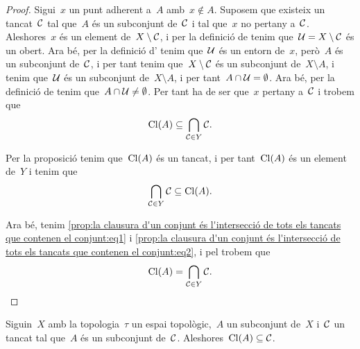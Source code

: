 \documentclass[../../main.tex]{subfiles}
\begin{document}
    \begin{proof}
        Sigui~\(x\) un punt adherent a~\(A\) amb~\(x\notin A\).
        Suposem que existeix un tancat~\(\mathcal{C}\) tal que~\(A\) és un subconjunt de~\(\mathcal{C}\) i tal que~\(x\) no pertany a~\(\mathcal{C}\).
        Aleshores~\(x\) és un element de~\(X\setminus\mathcal{C}\), i per la definició de  tenim que~\(\mathcal{U}=X\setminus\mathcal{C}\) és un obert.
        Ara bé, per la definició d' tenim que~\(\mathcal{U}\) és un entorn de~\(x\), però~\(A\) és un subconjunt de~\(\mathcal{C}\), i per tant tenim que~\(X\setminus\mathcal{C}\) és un subconjunt de~\(X\setminus A\), i tenim que~\(\mathcal{U}\) és un subconjunt de~\(X\setminus A\), i per tant~\(A\cap\mathcal{U}=\emptyset\).
        Ara bé, per la definició de  tenim que~\(A\cap\mathcal{U}\neq\emptyset\).
        Per tant ha de ser que~\(x\) pertany a~\(\mathcal{C}\) i trobem que
        \begin{equation}
            \label{prop:la clausura d'un conjunt és l'intersecció de tots els tancats que contenen el conjunt:eq1}
            \operatorname{Cl}(A)\subseteq\bigcap_{\mathcal{C}\in Y}\mathcal{C}.
        \end{equation}

        Per la proposició  tenim que~\(\operatorname{Cl}(A)\) és un tancat, i per tant~\(\operatorname{Cl}(A)\) és un element de~\(Y\) i tenim que
        \begin{equation}
            \label{prop:la clausura d'un conjunt és l'intersecció de tots els tancats que contenen el conjunt:eq2}
            \bigcap_{\mathcal{C}\in Y}\mathcal{C}\subseteq\operatorname{Cl}(A).
        \end{equation}

        Ara bé, tenim \eqref{prop:la clausura d'un conjunt és l'intersecció de tots els tancats que contenen el conjunt:eq1} i \eqref{prop:la clausura d'un conjunt és l'intersecció de tots els tancats que contenen el conjunt:eq2}, i pel  trobem que
        \[
            \operatorname{Cl}(A)=\bigcap_{\mathcal{C}\in Y}\mathcal{C}.\qedhere
        \]
    \end{proof}
    \begin{corollary}
        \label{cor:la clausura d'un conjunt és el tancat més petit que el conté}
        Siguin~\(X\) amb la topologia~\(\tau\) un espai topològic,~\(A\) un subconjunt de~\(X\) i~\(\mathcal{C}\) un tancat tal que~\(A\) és un subconjunt de~\(\mathcal{C}\).
        Aleshores~\(\operatorname{Cl}(A)\subseteq\mathcal{C}\).
    \end{corollary}
\end{document}
